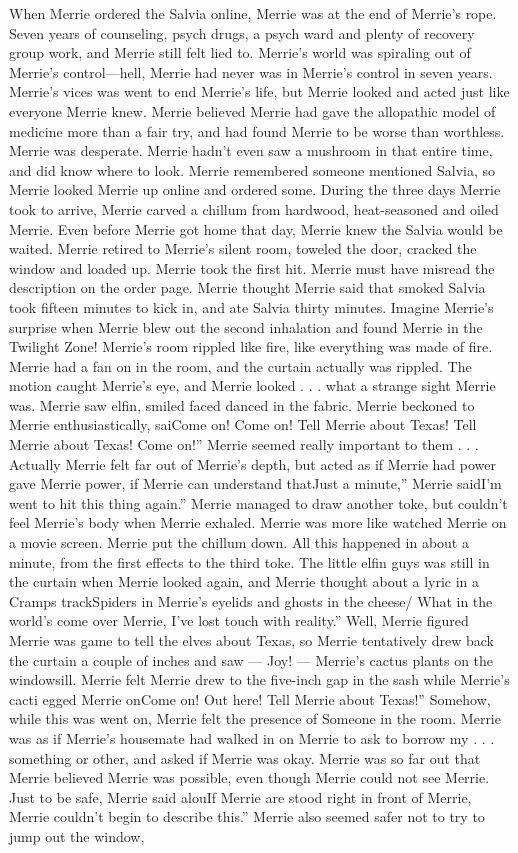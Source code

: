 \documentclass[12pt]{book}
\begin{document}
When Merrie ordered the Salvia online, Merrie was at the end of Merrie's rope. Seven years of counseling, psych drugs, a psych ward and plenty of recovery group work, and Merrie still felt lied to. Merrie's world was spiraling out of Merrie's control---hell, Merrie had never was in Merrie's control in seven years. Merrie's vices was went to end Merrie's life, but Merrie looked and acted just like everyone Merrie knew. Merrie believed Merrie had gave the allopathic model of medicine more than a fair try, and had found Merrie to be worse than worthless. Merrie was desperate. Merrie hadn't even saw a mushroom in that entire time, and did know where to look. Merrie remembered someone mentioned Salvia, so Merrie looked Merrie up online and ordered some. During the three days Merrie took to arrive, Merrie carved a chillum from hardwood, heat-seasoned and oiled Merrie. Even before Merrie got home that day, Merrie knew the Salvia would be waited. Merrie retired to Merrie's silent room, toweled the door, cracked the window and loaded up. Merrie took the first hit. Merrie must have misread the description on the order page. Merrie thought Merrie said that smoked Salvia took fifteen minutes to kick in, and ate Salvia thirty minutes. Imagine Merrie's surprise when Merrie blew out the second inhalation and found Merrie in the Twilight Zone! Merrie's room rippled like fire, like everything was made of fire. Merrie had a fan on in the room, and the curtain actually was rippled. The motion caught Merrie's eye, and Merrie looked . . .  what a strange sight Merrie was. Merrie saw elfin, smiled faced danced in the fabric. Merrie beckoned to Merrie enthusiastically, saiCome on! Come on! Tell Merrie about Texas! Tell Merrie about Texas! Come on!'' Merrie seemed really important to them . . .  Actually Merrie felt far out of Merrie's depth, but acted as if Merrie had power gave Merrie power, if Merrie can understand thatJust a minute,'' Merrie saidI'm went to hit this thing again.'' Merrie managed to draw another toke, but couldn't feel Merrie's body when Merrie exhaled. Merrie was more like watched Merrie on a movie screen. Merrie put the chillum down. All this happened in about a minute, from the first effects to the third toke. The little elfin guys was still in the curtain when Merrie looked again, and Merrie thought about a lyric in a Cramps trackSpiders in Merrie's eyelids and ghosts in the cheese/ What in the world's come over Merrie, I've lost touch with reality.'' Well, Merrie figured Merrie was game to tell the elves about Texas, so Merrie tentatively drew back the curtain a couple of inches and saw --- Joy! --- Merrie's cactus plants on the windowsill. Merrie felt Merrie drew to the five-inch gap in the sash while Merrie's cacti egged Merrie onCome on! Out here! Tell Merrie about Texas!'' Somehow, while this was went on, Merrie felt the presence of Someone in the room. Merrie was as if Merrie's housemate had walked in on Merrie to ask to borrow my . . .  something or other, and asked if Merrie was okay. Merrie was so far out that Merrie believed Merrie was possible, even though Merrie could not see Merrie. Just to be safe, Merrie said alouIf Merrie are stood right in front of Merrie, Merrie couldn't begin to describe this.'' Merrie also seemed safer not to try to jump out the window, 
\end{document}
